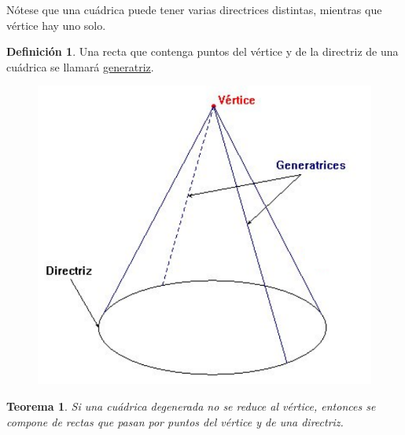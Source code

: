 \documentclass[12pt]{report}
\newtheorem{theorem}{Teorema}[chapter]
\theoremstyle{definition}
\newtheorem{definition}{Definición}[chapter]
\theoremstyle{definition}
\theoremstyle{remark}
\begin{document}
Nótese que una cuádrica puede tener varias directrices distintas, mientras que vértice hay uno solo.

\begin{definition}
Una recta que contenga puntos del vértice y de la directriz de una cuádrica se llamará \ul{generatriz}.
\end{definition}

\begin{figure}[h]
\includegraphics[scale = 0.27]{5.3_1}
\centering
\end{figure}

\begin{theorem}
\label{teo5.2.}
Si una cuádrica degenerada no se reduce al vértice, entonces se compone de rectas que pasan por puntos del vértice y de una directriz.
\end{theorem}
\end{document}
